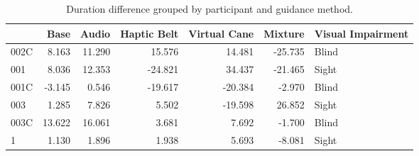 
\begin{table}[!htb]
\centering
\caption{Duration difference grouped by participant and guidance method.}
\label{tab:duracao_var}
\begin{tabular}{lrrrrrl}
\toprule
{} &   Base &  Audio &  Haptic Belt &  Virtual Cane &  Mixture & Visual Impairment \\
\midrule
002C &  8.163 & 11.290 &       15.576 &        14.481 &  -25.735 &             Blind \\
001  &  8.036 & 12.353 &      -24.821 &        34.437 &  -21.465 &             Sight \\
001C & -3.145 &  0.546 &      -19.617 &       -20.384 &   -2.970 &             Blind \\
003  &  1.285 &  7.826 &        5.502 &       -19.598 &   26.852 &             Sight \\
003C & 13.622 & 16.061 &        3.681 &         7.692 &   -1.700 &             Blind \\
1    &  1.130 &  1.896 &        1.938 &         5.693 &   -8.081 &             Sight \\
\bottomrule
\end{tabular}
\end{table}

